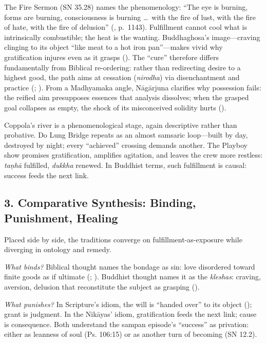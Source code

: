 The Fire Sermon (SN 35.28) names the phenomenology: ``The eye is burning, forms are burning, consciousness is burning \ldots\ with the fire of lust, with the fire of hate, with the fire of delusion'' (\parencite{BodhiSN2000}, p.~1143). Fulfillment cannot cool what is intrinsically combustible; the heat is the wanting. Buddhaghosa’s image---craving clinging to its object ``like meat to a hot iron pan''---makes vivid why gratification injures even as it grasps (\parencite{BuddhaghosaVisuddhi1956}). The ``cure'' therefore differs fundamentally from Biblical re-ordering: rather than redirecting desire to a highest good, the path aims at cessation (\emph{nirodha}) via disenchantment and practice (\parencite{Rahula1959}; \parencite{Gethin1998}). From a Madhyamaka angle, Nāgārjuna clarifies why possession fails: the reified aim presupposes essences that analysis dissolves; when the grasped goal collapses as empty, the shock of its misconceived solidity hurts (\parencite{NagarjunaMMK2013}).

Coppola’s river is a phenomenological stage, again descriptive rather than probative. Do Lung Bridge repeats as an almost samsaric loop---built by day, destroyed by night; every ``achieved'' crossing demands another. The Playboy show promises gratification, amplifies agitation, and leaves the crew more restless: \emph{taṇhā} fulfilled, \emph{dukkha} renewed. In Buddhist terms, such fulfillment is causal: success feeds the next link.

\subsection*{3. Comparative Synthesis: Binding, Punishment, Healing}
\label{ssec:3-comparative-synthesis-binding-punishment-healing}

Placed side by side, the traditions converge on fulfillment-as-exposure while diverging in ontology and remedy.

\emph{What binds?} Biblical thought names the bondage as sin: love disordered toward finite goods as if ultimate (; ). Buddhist thought names it as the \emph{kleshas}: craving, aversion, delusion that reconstitute the subject as grasping (\parencite{BodhiSN2000}).

\emph{What punishes?} In Scripture’s idiom, the will is ``handed over'' to its object (\parencite{FitzmyerRomans1993}); grant is judgment. In the Nikāyas’ idiom, gratification feeds the next link; cause is consequence. Both understand the sampan episode’s ``success'' as privation: either as leanness of soul (Ps. 106:15) or as another turn of becoming (SN 12.2).


